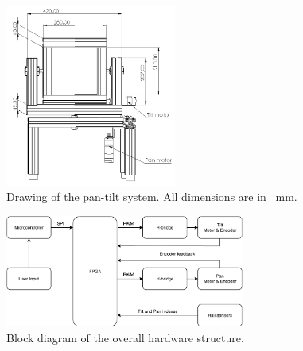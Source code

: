 \documentclass[../../main.tex]{subfiles}
\begin{document}



\begin{figure}
    \centering
    \includegraphics[width=0.5\textwidth]{Sections/Miscellaneous/Images/PhysicalMotorModel.png}
    \caption{Drawing of the pan-tilt system. All dimensions are in \SI{}{\milli \meter}.}
    \label{fig:Pan_Tilt_Drawing}
\end{figure}



\begin{figure}[H]
    \centering
    \includegraphics[width=0.7\textwidth]{Sections/Miscellaneous/Images/System_overview.pdf}
    \caption{Block diagram of the overall hardware structure.}
    \label{fig:SystemOverviewIntroduction}
\end{figure}
\end{document}
